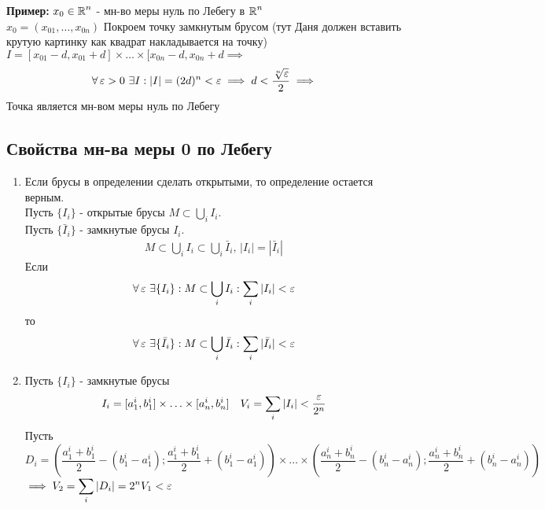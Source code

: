 \documentclass[a4paper, 10pt]{article}
\begin{document}
\textbf{Пример:} $x_0\in\operatorname{\mathbb{R}}^n$ - мн-во меры нуль по Лебегу в $\operatorname{\mathbb{R}}^n$\\
\proof $x_0 = (x_{01}, \ldots, x_{0n})$
Покроем точку замкнутым брусом (тут Даня должен вставить крутую картинку как квадрат накладывается на точку) $I = [x_{01}-d, x_{01}+d] \times\ldots\times[x_{0n}-d, x_{0n}+d \implies$\\
$$\forall \operatorname{\varepsilon} > 0\,\,\exists I: |I| = (2d)^n<\operatorname{\varepsilon} \implies d < \frac{\sqrt[n]{\operatorname{\varepsilon}}}{2} \implies$$
Точка является мн-вом меры нуль по Лебегу

\subsection{Свойства мн-ва меры 0 по Лебегу}
\begin{enumerate}
    \item Если брусы в определении сделать открытыми, то определение остается верным.\\
    \proof Пусть $\{I_i\}$ - открытые брусы  $M\subset \displaystyle\bigcup_iI_i$.\\
    Пусть $\{\bar I_i\}$ - замкнутые брусы $I_i$.
    \begin{equation*}
        \begin{aligned}
            M\subset\bigcup_iI_i \subset\bigcup_i\bar I_i, \, |I_i| = |\bar I_i|
        \end{aligned}
    \end{equation*}
    Если
    \begin{equation*}
        \forall\ve\, \exists\{I_i\}: M \subset \bigcup_iI_i: \sum_i|I_i|<\ve
    \end{equation*}
    то
    \begin{equation*}
        \forall\ve\, \exists\{\bar I_i\}: M \subset \bigcup_i\bar I_i: \sum_i|\bar I_i|<\ve
    \end{equation*}
    \item Пусть $\{I_i\}$ - замкнутые брусы
    \begin{equation*}
        I_i = [a^i_1, b^i_1]\times\ldots\times[a^i_n, b^i_n] \quad V_i = \sum_i|I_i|<\frac{\ve}{2^n}
    \end{equation*}
    Пусть 
    \begin{equation*}
        D_i = \left(\frac{a_1^i+b_1^i}{2} - (b_1^i-a_1^i) ; \frac{a_1^i + b_1^i}{2} + (b_1^i - a_1^i)\right) \times \ldots\times \left(\frac{a_n^i+b_n^i}{2} - (b_n^i-a_n^i) ; \frac{a_n^i + b_n^i}{2} + (b_n^i - a_n^i)\right)
    \end{equation*}
    $\implies V_2 = \displaystyle\sum_i|D_i| = 2^nV_1 < \ve$
    \QED
    
\end{enumerate}
\end{document}
